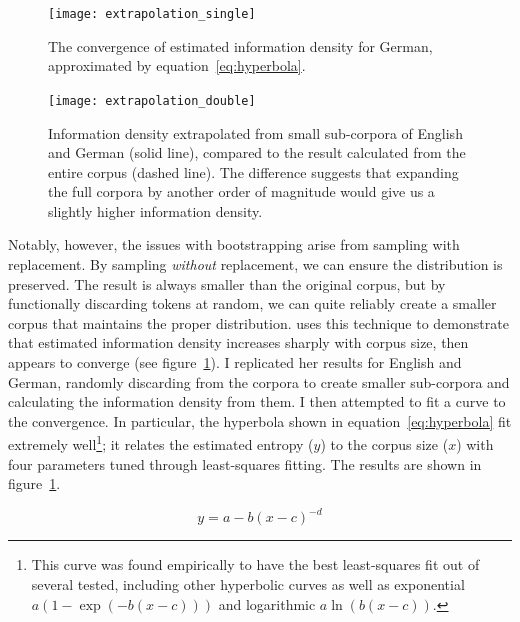 \documentclass[12pt,twoside]{article}
\begin{document}
\begin{figure}[p]
\centering
\caption{The convergence of estimated information density for German, approximated by equation~\ref{eq:hyperbola}.}
\label{fig:exsingle}
\noindent\texttt{[image: extrapolation\_single]}
\end{figure}

\begin{figure}[p]
\centering
\caption{Information density extrapolated from small sub-corpora of English and German (solid line), compared to the result calculated from the entire corpus (dashed line). The difference suggests that expanding the full corpora by another order of magnitude would give us a slightly higher information density.}
\label{fig:exdouble}
\noindent\texttt{[image: extrapolation\_double]}
\end{figure}

Notably, however, the issues with bootstrapping arise from sampling with replacement. By sampling \emph{without} replacement, we can ensure the distribution is preserved. The result is always smaller than the original corpus, but by functionally discarding tokens at random, we can quite reliably create a smaller corpus that maintains the proper distribution. \citet[57]{oh} uses this technique to demonstrate that estimated information density increases sharply with corpus size, then appears to converge (see figure~\ref{fig:exsingle}). I replicated her results for English and German, randomly discarding from the corpora to create smaller sub-corpora and calculating the information density from them. I then attempted to fit a curve to the convergence. In particular, the hyperbola shown in equation~\ref{eq:hyperbola} fit extremely well\footnote{This curve was found empirically to have the best least-squares fit out of several tested, including other hyperbolic curves as well as exponential \(a(1-\exp(-b(x-c)))\) and logarithmic \(a\ln(b(x-c))\).}; it relates the estimated entropy (\(y\)) to the corpus size (\(x\)) with four parameters tuned through least-squares fitting. The results are shown in figure~\ref{fig:exsingle}.

\begin{equation}
\label{eq:hyperbola}
y = a-b(x-c)^{-d}
\end{equation}
\end{document}
